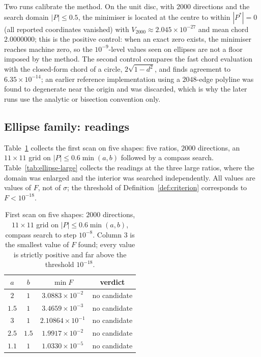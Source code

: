 \documentclass[11pt]{article}
\theoremstyle{definition}
\theoremstyle{remark}
\begin{document}
{Two runs calibrate the method. On the unit disc, with $2000$ directions and the search domain $|P|\le0.5$, the
minimiser is located at the centre to within $|P^{*}|=0$ (all reported coordinates vanished) with
$V_{2000}\approx2.045\times10^{-27}$ and mean chord $2.0000000$; this is the positive control: when an exact zero
exists, the minimiser reaches machine zero, so the $10^{-9}$-level values seen on ellipses are not a floor imposed
by the method. The second control compares the fast chord evaluation with the closed-form chord of a circle,
$2\sqrt{1-d^2}$, and finds agreement to $6.35\times10^{-14}$; an earlier reference implementation using a
$2048$-edge polyline was found to degenerate near the origin and was discarded, which is why the later runs use
the analytic or bisection convention only.

\subsection{Ellipse family: readings}

Table~\ref{tab:ellipse-small} collects the first scan on five shapes: five ratios, $2000$ directions, an
$11\times11$ grid on $|P|\le0.6\min(a,b)$ followed by a compass search. Table~\ref{tab:ellipse-large} collects
the readings at the three large ratios, where the domain was enlarged and the interior was searched
independently. All values are values of $F$, not of $\sigma$; the threshold of
Definition~\ref{def:criterion} corresponds to $F<10^{-18}$.

\begin{table}[htbp]
\centering
\small
\caption{First scan on five shapes: $2000$ directions, $11\times11$ grid on $|P|\le0.6\min(a,b)$, compass search
to step $10^{-8}$. Column 3 is the smallest value of $F$ found; every value is strictly positive and far above
the threshold $10^{-18}$.}
\label{tab:ellipse-small}
\begin{tabular}{@{}cccc@{}}
\toprule
$a$ & $b$ & $\min F$ & verdict \\
\midrule
$2$ & $1$ & $3.0883\times10^{-2}$ & no candidate \\
$1.5$ & $1$ & $3.4659\times10^{-3}$ & no candidate \\
$3$ & $1$ & $2.10864\times10^{-1}$ & no candidate \\
$2.5$ & $1.5$ & $1.9917\times10^{-2}$ & no candidate \\
$1.1$ & $1$ & $1.0330\times10^{-5}$ & no candidate \\
\bottomrule
\end{tabular}
\end{table}

}
\end{document}
